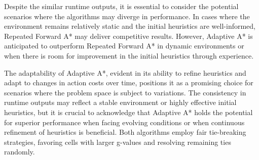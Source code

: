 Despite the similar runtime outputs, it is essential to consider the potential scenarios where the algorithms may diverge in performance. In cases where the environment remains relatively static and the initial heuristics are well-informed, Repeated Forward A* may deliver competitive results. However, Adaptive A* is anticipated to outperform Repeated Forward A* in dynamic environments or when there is room for improvement in the initial heuristics through experience.

The adaptability of Adaptive A*, evident in its ability to refine heuristics and adapt to changes in action costs over time, positions it as a promising choice for scenarios where the problem space is subject to variations. The consistency in runtime outputs may reflect a stable environment or highly effective initial heuristics, but it is crucial to acknowledge that Adaptive A* holds the potential for superior performance when facing evolving conditions or when continuous refinement of heuristics is beneficial. Both algorithms employ fair tie-breaking strategies, favoring cells with larger g-values and resolving remaining ties randomly.
